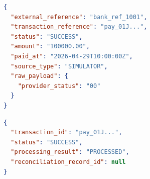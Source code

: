 \begin{lstlisting}[language=json,caption={Payment callback request example}]
{
  "external_reference": "bank_ref_1001",
  "transaction_reference": "pay_01J...",
  "status": "SUCCESS",
  "amount": "100000.00",
  "paid_at": "2026-04-29T10:00:00Z",
  "source_type": "SIMULATOR",
  "raw_payload": {
    "provider_status": "00"
  }
}
\end{lstlisting}

\begin{lstlisting}[language=json,caption={Payment callback response example}]
{
  "transaction_id": "pay_01J...",
  "status": "SUCCESS",
  "processing_result": "PROCESSED",
  "reconciliation_record_id": null
}
\end{lstlisting}
